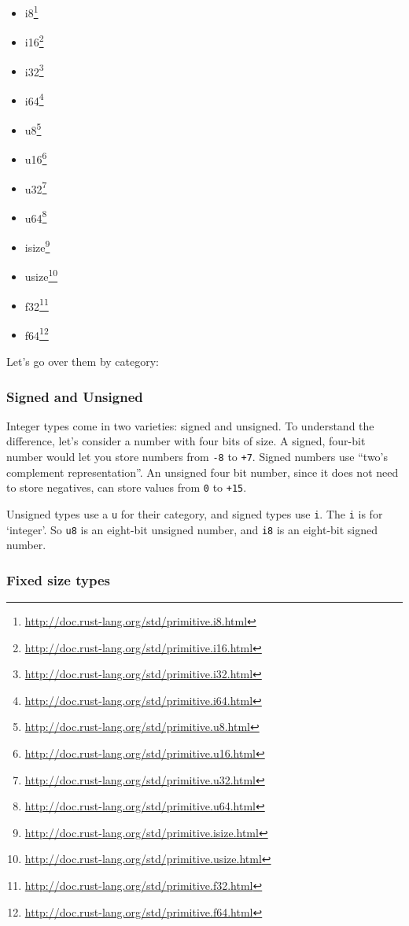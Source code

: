 \documentclass[a4paper,]{book}
\renewcommand{\href}[2]{#2\footnote{\url{#1}}}
\providecommand{\tightlist}{%
  \setlength{\itemsep}{0pt}\setlength{\parskip}{0pt}}
\begin{document}
\begin{itemize}
\tightlist
\item
  \href{http://doc.rust-lang.org/std/primitive.i8.html}{i8}
\item
  \href{http://doc.rust-lang.org/std/primitive.i16.html}{i16}
\item
  \href{http://doc.rust-lang.org/std/primitive.i32.html}{i32}
\item
  \href{http://doc.rust-lang.org/std/primitive.i64.html}{i64}
\item
  \href{http://doc.rust-lang.org/std/primitive.u8.html}{u8}
\item
  \href{http://doc.rust-lang.org/std/primitive.u16.html}{u16}
\item
  \href{http://doc.rust-lang.org/std/primitive.u32.html}{u32}
\item
  \href{http://doc.rust-lang.org/std/primitive.u64.html}{u64}
\item
  \href{http://doc.rust-lang.org/std/primitive.isize.html}{isize}
\item
  \href{http://doc.rust-lang.org/std/primitive.usize.html}{usize}
\item
  \href{http://doc.rust-lang.org/std/primitive.f32.html}{f32}
\item
  \href{http://doc.rust-lang.org/std/primitive.f64.html}{f64}
\end{itemize}

Let's go over them by category:

\subsubsection{Signed and Unsigned}\label{signed-and-unsigned}

Integer types come in two varieties: signed and unsigned. To understand
the difference, let's consider a number with four bits of size. A
signed, four-bit number would let you store numbers from \texttt{-8} to
\texttt{+7}. Signed numbers use ``two's complement representation''. An
unsigned four bit number, since it does not need to store negatives, can
store values from \texttt{0} to \texttt{+15}.

Unsigned types use a \texttt{u} for their category, and signed types use
\texttt{i}. The \texttt{i} is for `integer'. So \texttt{u8} is an
eight-bit unsigned number, and \texttt{i8} is an eight-bit signed
number.

\subsubsection{Fixed size types}\label{fixed-size-types}
\end{document}
